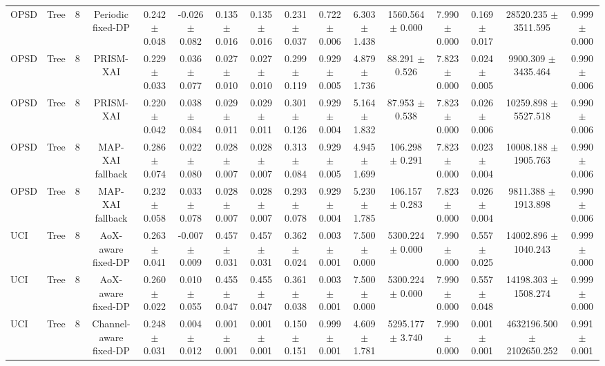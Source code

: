 \begin{tabular}{lccccccccccccccc}
OPSD & Tree & 8 & Periodic fixed-DP & 0.242 $\pm$ 0.048 & -0.026 $\pm$ 0.082 & 0.135 $\pm$ 0.016 & 0.135 $\pm$ 0.016 & 0.231 $\pm$ 0.037 & 0.722 $\pm$ 0.006 & 6.303 $\pm$ 1.438 & 1560.564 $\pm$ 0.000 & 7.990 $\pm$ 0.000 & 0.169 $\pm$ 0.017 & 28520.235 $\pm$ 3511.595 & 0.999 $\pm$ 0.000 \\
OPSD & Tree & 8 & PRISM-XAI & 0.229 $\pm$ 0.033 & 0.036 $\pm$ 0.077 & 0.027 $\pm$ 0.010 & 0.027 $\pm$ 0.010 & 0.299 $\pm$ 0.119 & 0.929 $\pm$ 0.005 & 4.879 $\pm$ 1.736 & 88.291 $\pm$ 0.526 & 7.823 $\pm$ 0.000 & 0.024 $\pm$ 0.005 & 9900.309 $\pm$ 3435.464 & 0.990 $\pm$ 0.006 \\
OPSD & Tree & 8 & PRISM-XAI & 0.220 $\pm$ 0.042 & 0.038 $\pm$ 0.084 & 0.029 $\pm$ 0.011 & 0.029 $\pm$ 0.011 & 0.301 $\pm$ 0.126 & 0.929 $\pm$ 0.004 & 5.164 $\pm$ 1.832 & 87.953 $\pm$ 0.538 & 7.823 $\pm$ 0.000 & 0.026 $\pm$ 0.006 & 10259.898 $\pm$ 5527.518 & 0.990 $\pm$ 0.006 \\
OPSD & Tree & 8 & MAP-XAI fallback & 0.286 $\pm$ 0.074 & 0.022 $\pm$ 0.080 & 0.028 $\pm$ 0.007 & 0.028 $\pm$ 0.007 & 0.313 $\pm$ 0.084 & 0.929 $\pm$ 0.005 & 4.945 $\pm$ 1.699 & 106.298 $\pm$ 0.291 & 7.823 $\pm$ 0.000 & 0.023 $\pm$ 0.004 & 10008.188 $\pm$ 1905.763 & 0.990 $\pm$ 0.006 \\
OPSD & Tree & 8 & MAP-XAI fallback & 0.232 $\pm$ 0.058 & 0.033 $\pm$ 0.078 & 0.028 $\pm$ 0.007 & 0.028 $\pm$ 0.007 & 0.293 $\pm$ 0.078 & 0.929 $\pm$ 0.004 & 5.230 $\pm$ 1.785 & 106.157 $\pm$ 0.283 & 7.823 $\pm$ 0.000 & 0.026 $\pm$ 0.004 & 9811.388 $\pm$ 1913.898 & 0.990 $\pm$ 0.006 \\
UCI & Tree & 8 & AoX-aware fixed-DP & 0.263 $\pm$ 0.041 & -0.007 $\pm$ 0.009 & 0.457 $\pm$ 0.031 & 0.457 $\pm$ 0.031 & 0.362 $\pm$ 0.024 & 0.003 $\pm$ 0.001 & 7.500 $\pm$ 0.000 & 5300.224 $\pm$ 0.000 & 7.990 $\pm$ 0.000 & 0.557 $\pm$ 0.025 & 14002.896 $\pm$ 1040.243 & 0.999 $\pm$ 0.000 \\
UCI & Tree & 8 & AoX-aware fixed-DP & 0.260 $\pm$ 0.022 & 0.010 $\pm$ 0.055 & 0.455 $\pm$ 0.047 & 0.455 $\pm$ 0.047 & 0.361 $\pm$ 0.038 & 0.003 $\pm$ 0.001 & 7.500 $\pm$ 0.000 & 5300.224 $\pm$ 0.000 & 7.990 $\pm$ 0.000 & 0.557 $\pm$ 0.048 & 14198.303 $\pm$ 1508.274 & 0.999 $\pm$ 0.000 \\
UCI & Tree & 8 & Channel-aware fixed-DP & 0.248 $\pm$ 0.031 & 0.004 $\pm$ 0.012 & 0.001 $\pm$ 0.001 & 0.001 $\pm$ 0.001 & 0.150 $\pm$ 0.151 & 0.999 $\pm$ 0.001 & 4.609 $\pm$ 1.781 & 5295.177 $\pm$ 3.740 & 7.990 $\pm$ 0.000 & 0.001 $\pm$ 0.001 & 4632196.500 $\pm$ 2102650.252 & 0.991 $\pm$ 0.001 \\

\end{tabular}
